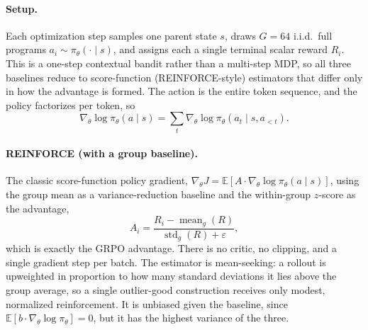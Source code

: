 
\paragraph{Setup.}
Each optimization step samples one parent state $s$, draws $G=64$ i.i.d.\ full
programs $a_i \sim \pi_\theta(\cdot \mid s)$, and assigns each a single terminal
scalar reward $R_i$. This is a one-step contextual bandit rather than a
multi-step MDP, so all three baselines reduce to score-function (REINFORCE-style)
estimators that differ only in how the advantage is formed. The action is the
entire token sequence, and the policy factorizes per token, so
\begin{equation}
  \nabla_\theta \log \pi_\theta(a \mid s)
  = \sum_{t} \nabla_\theta \log \pi_\theta\!\left(a_t \mid s, a_{<t}\right).
\end{equation}

\paragraph{REINFORCE (with a group baseline).}
The classic score-function policy gradient,
$\nabla_\theta J = \mathbb{E}\!\left[A \cdot \nabla_\theta \log \pi_\theta(a \mid s)\right]$,
using the group mean as a variance-reduction baseline and the within-group
$z$-score as the advantage,
\begin{equation}
  A_i = \frac{R_i - \operatorname{mean}_g(R)}{\operatorname{std}_g(R) + \varepsilon},
\end{equation}
which is exactly the GRPO advantage. There is no critic, no clipping, and a
single gradient step per batch. The estimator is mean-seeking: a rollout is
upweighted in proportion to how many standard deviations it lies above the group
average, so a single outlier-good construction receives only modest, normalized
reinforcement. It is unbiased given the baseline, since
$\mathbb{E}\!\left[b \cdot \nabla_\theta \log \pi_\theta\right] = 0$, but it has
the highest variance of the three.

